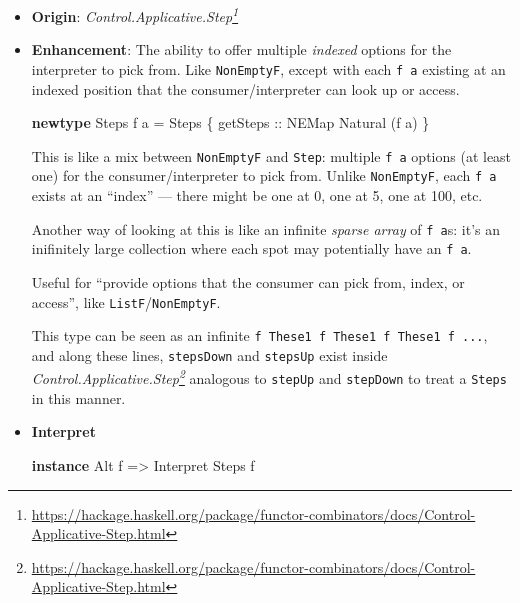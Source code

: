\documentclass[]{article}
\newenvironment{Shaded}{}{}
\newcommand{\DataTypeTok}[1]{\textcolor[rgb]{0.56,0.13,0.00}{#1}}
\newcommand{\KeywordTok}[1]{\textcolor[rgb]{0.00,0.44,0.13}{\textbf{#1}}}
\newcommand{\NormalTok}[1]{#1}
\newcommand{\OtherTok}[1]{\textcolor[rgb]{0.00,0.44,0.13}{#1}}
\renewcommand{\href}[2]{#2\footnote{\url{#1}}}
\begin{document}
\begin{itemize}
\item
  \textbf{Origin}:
  \emph{\href{https://hackage.haskell.org/package/functor-combinators/docs/Control-Applicative-Step.html}{Control.Applicative.Step}}
\item
  \textbf{Enhancement}: The ability to offer multiple \emph{indexed} options for
  the interpreter to pick from. Like \texttt{NonEmptyF}, except with each
  \texttt{f\ a} existing at an indexed position that the consumer/interpreter
  can look up or access.

\begin{Shaded}
\begin{Highlighting}[]
\KeywordTok{newtype} \DataTypeTok{Steps}\NormalTok{ f a }\OtherTok{=} \DataTypeTok{Steps}\NormalTok{ \{}\OtherTok{ getSteps ::} \DataTypeTok{NEMap} \DataTypeTok{Natural}\NormalTok{ (f a) \}}
\end{Highlighting}
\end{Shaded}

  This is like a mix between \texttt{NonEmptyF} and \texttt{Step}: multiple
  \texttt{f\ a} options (at least one) for the consumer/interpreter to pick
  from. Unlike \texttt{NonEmptyF}, each \texttt{f\ a} exists at an ``index'' ---
  there might be one at 0, one at 5, one at 100, etc.

  Another way of looking at this is like an infinite \emph{sparse array} of
  \texttt{f\ a}s: it's an inifinitely large collection where each spot may
  potentially have an \texttt{f\ a}.

  Useful for ``provide options that the consumer can pick from, index, or
  access'', like \texttt{ListF}/\texttt{NonEmptyF}.

  This type can be seen as an infinite
  \texttt{f\ \textasciigrave{}These1\textasciigrave{}\ f\ \textasciigrave{}These1\textasciigrave{}\ f\ \textasciigrave{}These1\textasciigrave{}\ f\ ...},
  and along these lines, \texttt{stepsDown} and \texttt{stepsUp} exist inside
  \emph{\href{https://hackage.haskell.org/package/functor-combinators/docs/Control-Applicative-Step.html}{Control.Applicative.Step}}
  analogous to \texttt{stepUp} and \texttt{stepDown} to treat a \texttt{Steps}
  in this manner.
\item
  \textbf{Interpret}

\begin{Shaded}
\begin{Highlighting}[]
\KeywordTok{instance} \DataTypeTok{Alt}\NormalTok{ f }\OtherTok{=>} \DataTypeTok{Interpret} \DataTypeTok{Steps}\NormalTok{ f}


\end{Highlighting}
\end{Shaded}
\end{itemize}
\end{document}
